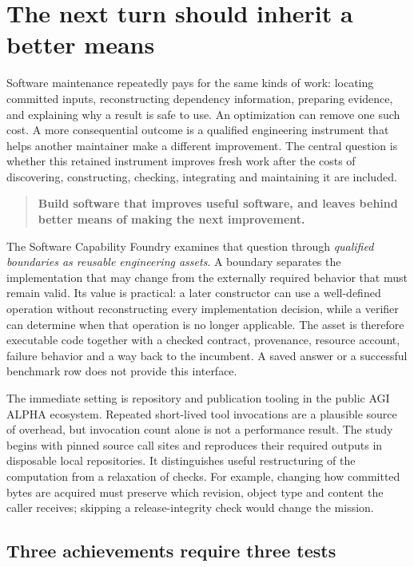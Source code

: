 \section{The next turn should inherit a better means}
\label{sec:introduction}

Software maintenance repeatedly pays for the same kinds of work: locating committed inputs, reconstructing dependency information, preparing evidence, and explaining why a result is safe to use. An optimization can remove one such cost. A more consequential outcome is a qualified engineering instrument that helps another maintainer make a different improvement. The central question is whether this retained instrument improves fresh work after the costs of discovering, constructing, checking, integrating and maintaining it are included.

\begin{quote}
\textbf{Build software that improves useful software, and leaves behind better means of making the next improvement.}
\end{quote}

The Software Capability Foundry examines that question through \emph{qualified boundaries as reusable engineering assets}. A boundary separates the implementation that may change from the externally required behavior that must remain valid. Its value is practical: a later constructor can use a well-defined operation without reconstructing every implementation decision, while a verifier can determine when that operation is no longer applicable. The asset is therefore executable code together with a checked contract, provenance, resource account, failure behavior and a way back to the incumbent. A saved answer or a successful benchmark row does not provide this interface.

The immediate setting is repository and publication tooling in the public AGI ALPHA ecosystem. Repeated short-lived tool invocations are a plausible source of overhead, but invocation count alone is not a performance result. The study begins with pinned source call sites and reproduces their required outputs in disposable local repositories. It distinguishes useful restructuring of the computation from a relaxation of checks. For example, changing how committed bytes are acquired must preserve which revision, object type and content the caller receives; skipping a release-integrity check would change the mission.

\subsection{Three achievements require three tests}

